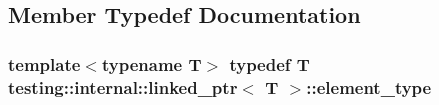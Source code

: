 \subsection{Member Typedef Documentation}
\hypertarget{classtesting_1_1internal_1_1linked__ptr_a295c7d1ee4100d916514c4e4385a0063}{
\subsubsection[{element\-\_\-type}]{\setlength{\rightskip}{0pt plus 5cm}template$<$typename T$>$ typedef {\bf T} {\bf testing\-::internal\-::linked\-\_\-ptr}$<$ {\bf T} $>$\-::{\bf element\-\_\-type}}}\label{classtesting_1_1internal_1_1linked__ptr_a295c7d1ee4100d916514c4e4385a0063}


